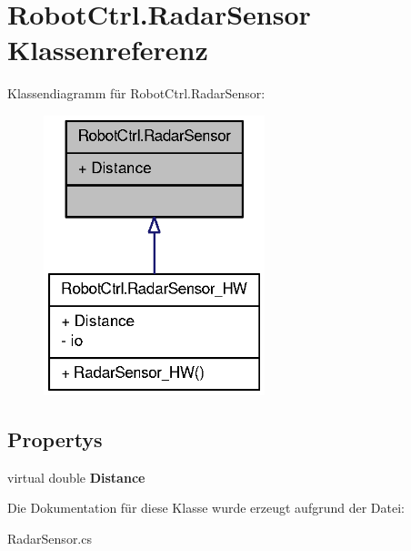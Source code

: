 \hypertarget{class_robot_ctrl_1_1_radar_sensor}{
\section{RobotCtrl.RadarSensor Klassenreferenz}
\label{class_robot_ctrl_1_1_radar_sensor}
}


Klassendiagramm für RobotCtrl.RadarSensor:\nopagebreak
\begin{figure}[H]
\begin{center}
\leavevmode
\includegraphics[width=182pt]{class_robot_ctrl_1_1_radar_sensor__inherit__graph}
\end{center}
\end{figure}
\subsection*{Propertys}
\begin{DoxyCompactItemize}
\item 
\hypertarget{class_robot_ctrl_1_1_radar_sensor_a1be5541f3153ba40736f7a9fa292375b}{
virtual double {\bfseries Distance}}
\label{class_robot_ctrl_1_1_radar_sensor_a1be5541f3153ba40736f7a9fa292375b}

\end{DoxyCompactItemize}


Die Dokumentation für diese Klasse wurde erzeugt aufgrund der Datei:\begin{DoxyCompactItemize}
\item 
RadarSensor.cs\end{DoxyCompactItemize}
